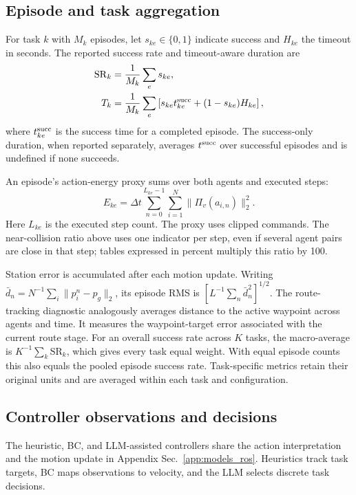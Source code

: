 \subsection{Episode and task aggregation}

For task $k$ with $M_k$ episodes, let $s_{ke}\in\{0,1\}$ indicate success and $H_{ke}$ the timeout in seconds. The reported success rate and timeout-aware duration are
\begin{align}
\mathrm{SR}_k&=\frac{1}{M_k}\sum_e s_{ke},\\
T_k&=\frac{1}{M_k}\sum_e\left[s_{ke}t_{ke}^{\rm succ}
                         +(1-s_{ke})H_{ke}\right],
\end{align}
where $t_{ke}^{\rm succ}$ is the success time for a completed episode. The success-only duration, when reported separately, averages $t^{\rm succ}$ over successful episodes and is undefined if none succeeds.

An episode's action-energy proxy sums over both agents and executed steps:
\begin{equation}
E_{ke}=\Delta t\sum_{n=0}^{L_{ke}-1}\sum_{i=1}^{N}
                   \|\Pi_v(a_{i,n})\|_2^2.
\end{equation}
Here $L_{ke}$ is the executed step count. The proxy uses clipped commands. The near-collision ratio above uses one indicator per step, even if several agent pairs are close in that step; tables expressed in percent multiply this ratio by 100.

Station error is accumulated after each motion update. Writing $\bar d_n=N^{-1}\sum_i\|p_i^n-p_g\|_2$, its episode RMS is $[L^{-1}\sum_n\bar d_n^2]^{1/2}$. The route-tracking diagnostic analogously averages distance to the active waypoint across agents and time. It measures the waypoint-target error associated with the current route stage. For an overall success rate across $K$ tasks, the macro-average is $K^{-1}\sum_k\mathrm{SR}_k$, which gives every task equal weight. With equal episode counts this also equals the pooled episode success rate. Task-specific metrics retain their original units and are averaged within each task and configuration.

\subsection{Controller observations and decisions}

The heuristic, BC, and LLM-assisted controllers share the action interpretation and the motion update in Appendix Sec.~\ref{app:models_ros}. Heuristics track task targets, BC maps observations to velocity, and the LLM selects discrete task decisions.

